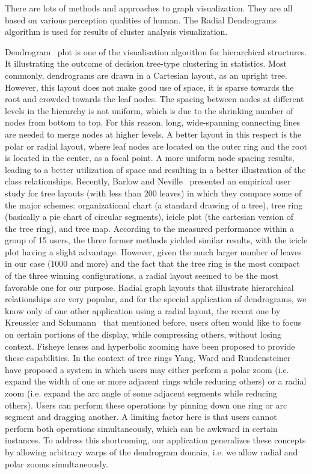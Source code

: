 There are lots of methods and approaches to graph visualization. They are all based on various perception qualities of human. The Radial Dendrograms~\cite{Radial_dendrogram} algorithm is used for results of cluster analysis visualization.

Dendrogram~\cite{Dendrogram} plot is one of the visualisation algorithm for hierarchical structures. It illustrating the outcome of decision tree-type clustering in statistics. Most commonly, dendrograms are drawn in a Cartesian layout, as an upright tree. However, this layout does not make good use of space, it is sparse towards the root and crowded towards the leaf nodes. The spacing between nodes at different levels in the hierarchy is not uniform, which is due to the shrinking number of nodes from bottom to top. For this reason, long, wide-spanning connecting lines are needed to merge nodes at higher levels. A better layout in this respect is the polar or radial layout, where leaf nodes are located on the outer ring and the root is located in the center, as a focal point. A more uniform node spacing results, leading to a better utilization of space and resulting in a better illustration of the class relationships. Recently, Barlow and Neville~\cite{Barlow_Neville} presented an empirical user study for tree layouts (with less than 200 leaves) in which they compare some of the major schemes: organizational chart (a standard drawing of a tree), tree ring (basically a pie chart of circular segments), icicle plot (the cartesian version of the tree ring), and tree map. According to the measured performance within a group of 15 users, the three former methods yielded similar results, with the icicle plot having a slight advantage. However, given the much larger number of leaves in our case (1000 and more) and the fact that the tree ring is the most compact of the three winning configurations, a radial layout seemed to be the most favorable one for our purpose. Radial graph layouts that illustrate hierarchical relationships are very popular, and for the special application of dendrograms, we know only of one other application using a radial layout, the recent one by Kreussler and Schumann~\cite{Kreussler_Schumann} that mentioned before, users often would like to focus on certain portions of the display, while compressing others, without losing context. Fisheye lenses and hyperbolic zooming have been proposed to provide these capabilities. In the context of tree rings Yang, Ward and Rundensteiner~\cite{Yang_Ward} have proposed a system in which users may either perform a polar zoom (i.e. expand the width of one or more adjacent rings while reducing others) or a radial zoom (i.e. expand the arc angle of some adjacent segments while reducing others). Users can perform these operations by pinning down one ring or arc segment and dragging another. A limiting factor here is that users cannot perform both operations simultaneously, which can be awkward in certain instances. To address this shortcoming, our application generalizes these concepts by allowing arbitrary warps of the dendrogram domain, i.e. we allow radial and polar zooms simultaneously.



